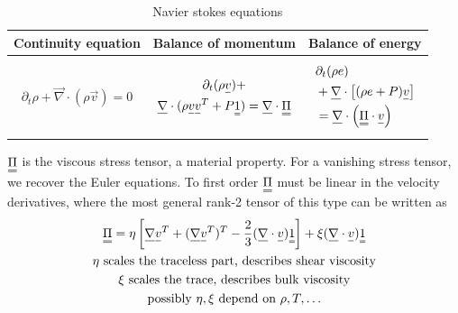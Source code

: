 \begin{table}[!htb]
    \centering
    \begin{tabular}{|p{}|p{}|p{}|}
        \hline
        \textcolor{blue1}{Continuity equation} & \textcolor{blue1}{Balance of momentum} &  \textcolor{blue1}{Balance of energy} \\
        \hline
        \begin{equation}
            \partial_t \rho + \vec{\nabla} \cdot (\rho \vec{v}) = 0
        \end{equation} &
        \begin{equation}
            \begin{gathered}
                \partial_t (\rho \vec{v}) + \\ \vec{\nabla} \cdot (\rho \vec{v}\vec{v}^T + P\mat{1}) = \vec{\nabla} \cdot \mat{\Pi}
            \end{gathered}
        \end{equation} &
        \begin{equation}
            \begin{aligned}
                & \partial_t (\rho e) \\ &+ \vec{\nabla} \cdot \left[(\rho e + P)\vec{v} \right] \\ &= \vec{\nabla} \cdot \left( \mat{\Pi} \cdot \vec{v} \right)
            \end{aligned}
        \end{equation} \\
        \hline
    \end{tabular}
    \caption{Navier stokes equations}
    \label{tab:navier_stokes_eq}
\end{table}

$\mat{\Pi}$ is the viscous stress tensor, a material property. For a vanishing stress tensor, we
recover the Euler equations. To first order $\mat{\Pi}$ must be linear in the velocity derivatives,
where the most general rank-2 tensor of this type can be written as
\begin{equation}
    \begin{gathered}
        \mat{\Pi} = \eta \left[ \vec{\nabla} \vec{v}^T + (\vec{\nabla} \vec{v}^T)^T - \frac{2}{3} (\vec{\nabla} \cdot \vec{v}) \mat{1} \right] + \xi (\vec{\nabla} \cdot \vec{v}) \mat{1} \\
        \eta \text{ scales the traceless part, describes shear viscosity} \\
        \xi \text{ scales the trace, describes bulk viscosity} \\
        \text{possibly } \eta, \xi \text{ depend on } \rho, T, \dots
    \end{gathered}
\end{equation}

